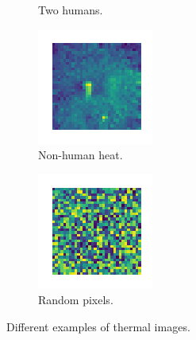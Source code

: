 \documentclass[10pt,letterpaper,conference]{IEEEtran}
\begin{document}
\begin{figure}[!ht]
\begin{subfigure}{0.2\textwidth}
      \caption{Two humans.}
      \label{fig:second}
  \end{subfigure}
  \hfill
  \begin{subfigure}{0.2\textwidth}
      \includegraphics[width=\textwidth]{non-human.png}
      \caption{Non-human heat.}
      \label{fig:second}
  \end{subfigure}
  \begin{subfigure}{0.2\textwidth}
      \includegraphics[width=\textwidth]{random.png}
      \caption{Random pixels.}
      \label{fig:third}
  \end{subfigure}
          
  \caption{Different examples of thermal images.}
  \label{fig:sample-frames}
  \end{figure}
\end{document}
